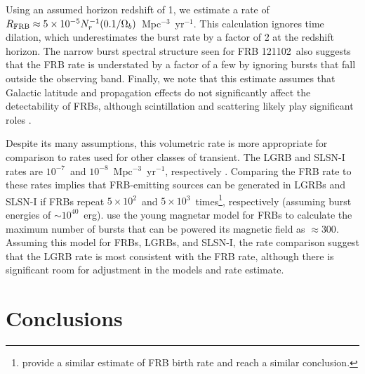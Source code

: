 \documentclass[twocolumn]{aastex61}
\newcommand{\frb}{FRB 121102}
\begin{document}
Using an assumed horizon redshift of 1, we estimate a rate of $R_{\rm{FRB}} \approx 5\times10^{-5} N_r^{-1} (0.1/\Omega_b)$\ Mpc$^{-3}$\ yr$^{-1}$. This calculation ignores time dilation, which underestimates the burst rate by a factor of 2 at the redshift horizon. The narrow burst spectral structure seen for \frb\ also suggests that the FRB rate is understated by a factor of a few by ignoring bursts that fall outside the observing band. Finally, we note that this estimate assumes that Galactic latitude and propagation effects do not significantly affect the detectability of FRBs, although scintillation and scattering likely play significant roles \citep{2015MNRAS.451.3278M, CORDES}.

Despite its many assumptions, this volumetric rate is more appropriate for comparison to rates used for other classes of transient. The LGRB and SLSN-I rates are $10^{-7}$\ and $10^{-8}$\ Mpc$^{-3}$\ yr$^{-1}$, respectively \citep{2007ApJ...657L..73G,2012Sci...337..927G}. Comparing the FRB rate to these rates implies that FRB-emitting sources can be generated in LGRBs and SLSN-I if FRBs repeat $5\times10^2$\ and $5\times10^3$\ times\footnote{\citet{2017arXiv170400022N} provide a similar estimate of FRB birth rate and reach a similar conclusion.}, respectively (assuming burst energies of $\sim10^{40}$\ erg). \citet{2017arXiv170102370M} use the young magnetar model for FRBs to calculate the maximum number of bursts that can be powered its magnetic field as $\approx300$. Assuming this model for FRBs, LGRBs, and SLSN-I, the rate comparison suggest that the LGRB rate is most consistent with the FRB rate, although there is significant room for adjustment in the models and rate estimate.


\section{Conclusions}
\end{document}
